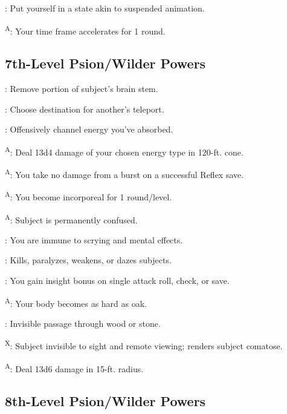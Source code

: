 : Put yourself in a state akin to suspended animation.

\textsuperscript{A}: Your time frame accelerates for 1 round.




\subsection{7th-Level Psion/Wilder Powers}

: Remove portion of subject’s brain stem.

: Choose destination for another’s teleport.

: Offensively channel energy you’ve absorbed.

\textsuperscript{A}: Deal 13d4 damage of your chosen energy type in 120-ft. cone.

\textsuperscript{A}: You take no damage from a burst on a successful Reflex save.

\textsuperscript{A}: You become incorporeal for 1 round/level.

\textsuperscript{A}: Subject is permanently confused.

: You are immune to scrying and mental effects.

: Kills, paralyzes, weakens, or dazes subjects.

: You gain insight bonus on single attack roll, check, or save.

\textsuperscript{A}: Your body becomes as hard as oak.

: Invisible passage through wood or stone.

\textsuperscript{X}: Subject invisible to sight and remote viewing; renders subject comatose.

\textsuperscript{A}: Deal 13d6 damage in 15-ft. radius.




\subsection{8th-Level Psion/Wilder Powers}

